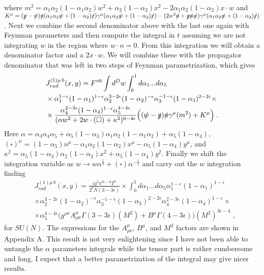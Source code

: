 \documentclass[%
 reprint,
 amsmath,amssymb,
 aps,
]{revtex4-1}
\begin{document}
where $m^2=\alpha_1\alpha_2(1-\alpha_1\alpha_2)w^2+\alpha_2(1-\alpha_2)x^2-2\alpha_1\alpha_2(1-\alpha_2)  x\cdot w$ and $K^\mu=(\slashed y-\slashed w) \slashed n (\alpha_1\alpha_2 \slashed w+(1-\alpha_2)\slashed x)\gamma^\mu(\alpha_1\alpha_2 \slashed w+(1-\alpha_2)\slashed x)-(2
w^2\slashed n+\slashed y\slashed n \slashed w)\gamma^\mu(\alpha_1\alpha_2 \slashed w+(1-\alpha_2)\slashed x)$. Next we combine the second denominator above with the last one again with Feynman parameters and then compute the integral in $t$ assuming we are not integrating $w$ in the region where $w\cdot n=0$. From this integration we will obtain a denominator factor and a $2x\cdot w$. We will combine these with the propagator denominator that was left in two steps of Feynman parametrization, which gives
\begin{align}
&J^{(1)\mu\,b}_{rad}(x,y)=F''^b\int d^Dw \int_0^1d\alpha_1...d\alpha_5\nonumber\\
&\times{\alpha_1^{1-\epsilon}(1-\alpha_1)^{1-\epsilon}\alpha_2^{3-2\epsilon}(1-\alpha_2)^{-\epsilon}\alpha_3^{-1-\epsilon}(1-\alpha_3)^{2-2\epsilon}}\times\nonumber\\
&\times \frac{\alpha_4^{2-3\epsilon}(1-\alpha_4)^{1-\epsilon}\alpha_5^{4-4\epsilon}}{(\alpha w^2+2w\cdot (\square)+\kappa^2)^{6-4\epsilon}}\Big((\slashed w-\slashed y)\slashed n \gamma^\mu (m^2)+K^\mu\Big)\;.
\end{align}
Here $\alpha=\alpha_3\alpha_4\alpha_5+\alpha_5(1-\alpha_3)\alpha_1\alpha_2(1-\alpha_1\alpha_2)+\alpha_5(1-\alpha_4)$, $(\square)^\mu=(1-\alpha_5)n^\mu-\alpha_1\alpha_2(1-\alpha_2)x^\mu-\alpha_5(1-\alpha_4)y^\mu$, and $\kappa^2=\alpha_5(1-\alpha_3)\alpha_2(1-\alpha_2)x^2+\alpha_5(1-\alpha_4)y^2$. Finally we shift the integration variable as $w\to w\alpha^{\frac{1}{2}}+(\square)\alpha^{-\frac{1}{2}}$ and carry out the $w$ integration finding
\begin{align}
&J^{(1)\mu\,b}_{rad}(x,y)=\frac{ig^3\pi^{3\epsilon-6}T^b}{2^8N(3-3\epsilon)}\times\int_0^1d\alpha_1...d\alpha_5\alpha_1^{1-\epsilon}(1-\alpha_1)^{1-\epsilon}\nonumber\\
&\times\alpha_2^{3-2\epsilon}(1-\alpha_2)^{-\epsilon}\alpha_3^{-1-\epsilon}(1-\alpha_3)^{2-2\epsilon} \alpha_4^{2-3\epsilon}(1-\alpha_4)^{1-\epsilon}\times\nonumber\\
&\times\alpha_5^{4-4\epsilon}\Big(g^{\rho\sigma}A^\mu_{\rho\sigma}\Gamma(3-3\epsilon)(M^2)+B^\mu\Gamma(4-3\epsilon)\Big)(M^2)^{3\epsilon-4}\;,\label{HAHAHA}
\end{align}
for $SU(N)$.
The expressions for the $A_{\rho\nu}^\mu$, $B^\mu$, and $M^2$ factors are shown in Appendix A. This result is not very enlightening since I have not been able to untangle the $\alpha$ parameters integrals while the tensor part is rather cumbersome and long. I expect that a better parametrization of the integral may give nicer results.
\end{document}
